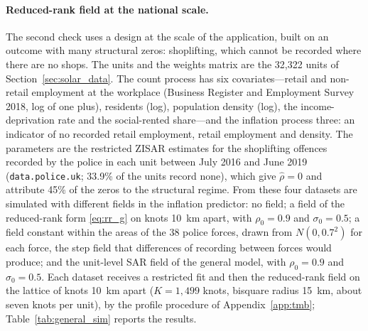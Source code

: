 \paragraph{Reduced-rank field at the national scale.}
The second check uses a design at the scale of the application, built on an outcome with many structural zeros: shoplifting, which cannot be recorded where there are no shops.
The units and the weights matrix are the 32{,}322 units of Section~\ref{sec:solar_data}.
The count process has six covariates---retail and non-retail employment at the workplace (Business Register and Employment Survey 2018, log of one plus), residents (log), population density (log), the income-deprivation rate and the social-rented share---and the inflation process three: an indicator of no recorded retail employment, retail employment and density.
The parameters are the restricted ZISAR estimates for the shoplifting offences recorded by the police in each unit between July 2016 and June 2019 (\texttt{data.police.uk}; 33.9\% of the units record none), which give $\hat\rho = 0$ and attribute 45\% of the zeros to the structural regime.
From these four datasets are simulated with different fields in the inflation predictor: no field; a field of the reduced-rank form \eqref{eq:rr_g} on knots 10~km apart, with $\rho_0 = 0.9$ and $\sigma_0 = 0.5$; a field constant within the areas of the 38 police forces, drawn from $N(0, 0.7^2)$ for each force, the step field that differences of recording between forces would produce; and the unit-level SAR field of the general model, with $\rho_0 = 0.9$ and $\sigma_0 = 0.5$.
Each dataset receives a restricted fit and then the reduced-rank field on the lattice of knots 10~km apart ($K = 1{,}499$ knots, bisquare radius 15~km, about seven knots per unit), by the profile procedure of Appendix~\ref{app:tmb}; Table~\ref{tab:general_sim} reports the results.


